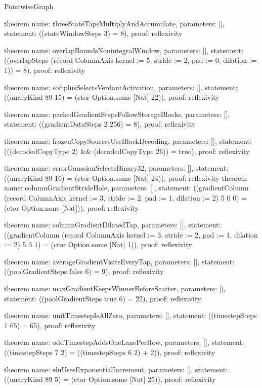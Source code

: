 \begin{lexlean}{PointwiseGraph}
\begin{semanticmodule}
theorem{
  name: threeStateTapsMultiplyAndAccumulate,
  parameters: [],
  statement: ((stateWindowSteps 3) = 8),
  proof: reflexivity{}
}

theorem{
  name: overlapBoundsNonintegralWindow,
  parameters: [],
  statement: ((overlapSteps (record ColumnAxis {kernel := 5, stride := 2, pad := 0, dilation := 1})) = 8),
  proof: reflexivity{}
}

theorem{
  name: softplusSelectsVerdantActivation,
  parameters: [],
  statement: ((unaryKind 89 15) = (ctor Option.some [Nat] 22)),
  proof: reflexivity{}
}

theorem{
  name: packedGradientStepsFollowStorageBlocks,
  parameters: [],
  statement: ((gradientDataSteps 2 256) = 8),
  proof: reflexivity{}
}

theorem{
  name: frozenCopySourcesUseBlockDecoding,
  parameters: [],
  statement: (((decodedCopyType 2) && (decodedCopyType 26)) = true),
  proof: reflexivity{}
}

theorem{
  name: errorGaussianSelectsBinary32,
  parameters: [],
  statement: ((unaryKind 89 16) = (ctor Option.some [Nat] 24)),
  proof: reflexivity{}
}
theorem{
  name: columnGradientStrideHole,
  parameters: [],
  statement: ((gradientColumn (record ColumnAxis {kernel := 3, stride := 2, pad := 1, dilation := 2}) 5 0 0) = (ctor Option.none [Nat])),
  proof: reflexivity{}
}

theorem{
  name: columnGradientDilatedTap,
  parameters: [],
  statement: ((gradientColumn (record ColumnAxis {kernel := 3, stride := 2, pad := 1, dilation := 2}) 5 3 1) = (ctor Option.some [Nat] 1)),
  proof: reflexivity{}
}

theorem{
  name: averageGradientVisitsEveryTap,
  parameters: [],
  statement: ((poolGradientSteps false 6) = 9),
  proof: reflexivity{}
}

theorem{
  name: maxGradientKeepsWinnerBeforeScatter,
  parameters: [],
  statement: ((poolGradientSteps true 6) = 22),
  proof: reflexivity{}
}

theorem{
  name: unitTimestepIsAllZero,
  parameters: [],
  statement: ((timestepSteps 1 65) = 65),
  proof: reflexivity{}
}

theorem{
  name: oddTimestepAddsOneLanePerRow,
  parameters: [],
  statement: ((timestepSteps 7 2) = ((timestepSteps 6 2) + 2)),
  proof: reflexivity{}
}

theorem{
  name: eluUsesExponentialIncrement,
  parameters: [],
  statement: ((unaryKind 89 5) = (ctor Option.some [Nat] 25)),
  proof: reflexivity{}
}


\end{semanticmodule}
\end{lexlean}
